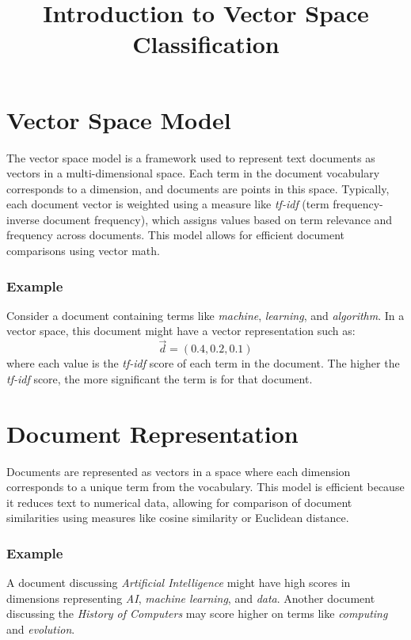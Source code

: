 \documentclass{article}
\title{Introduction to Vector Space Classification}
\date{}
\begin{document}
\maketitle

\section{Vector Space Model}

The vector space model is a framework used to represent text documents as vectors in a multi-dimensional space. Each term in the document vocabulary corresponds to a dimension, and documents are points in this space. Typically, each document vector is weighted using a measure like \textit{tf-idf} (term frequency-inverse document frequency), which assigns values based on term relevance and frequency across documents. This model allows for efficient document comparisons using vector math.

\subsubsection*{Example}
Consider a document containing terms like \textit{machine}, \textit{learning}, and \textit{algorithm}. In a vector space, this document might have a vector representation such as:
\[
\vec{d} = (0.4, 0.2, 0.1)
\]
where each value is the \textit{tf-idf} score of each term in the document. The higher the \textit{tf-idf} score, the more significant the term is for that document.

\section{Document Representation}

Documents are represented as vectors in a space where each dimension corresponds to a unique term from the vocabulary. This model is efficient because it reduces text to numerical data, allowing for comparison of document similarities using measures like cosine similarity or Euclidean distance.

\subsubsection*{Example}
A document discussing \textit{Artificial Intelligence} might have high scores in dimensions representing \textit{AI}, \textit{machine learning}, and \textit{data}. Another document discussing the \textit{History of Computers} may score higher on terms like \textit{computing} and \textit{evolution}.
\end{document}
